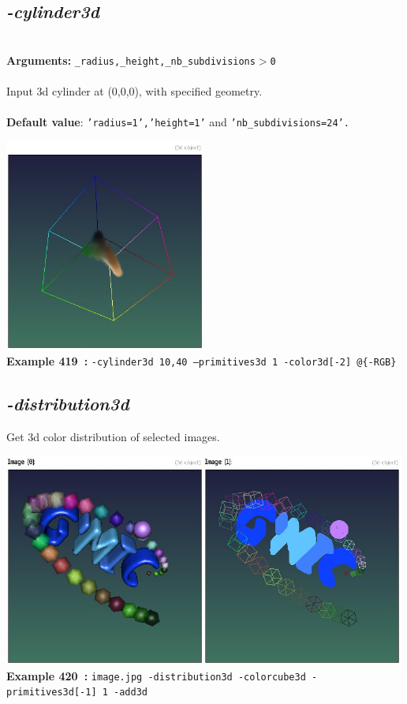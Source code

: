\documentclass[a4paper,11pt,twoside]{book}
\begin{document}
\subsection{\emph{-cylinder3d} }\vspace*{-0.5em}
~\\\textbf{Arguments: } 
{\small \texttt{\_radius,\_height,\_nb\_subdivisions$>$0}}\\~\\
Input 3d cylinder at (0,0,0), with specified geometry.
~\\~\\\textbf{Default value}: {\small \texttt{'radius=1','height=1'} and \texttt{'nb\_subdivisions=24'.}}
\begin{center}\includegraphics[keepaspectratio=true,height=7cm,width=\textwidth]{img/gmic_def419.jpg}\\
{\footnotesize \textbf{Example 419~:} \texttt{-cylinder3d 10,40 --primitives3d 1 -color3d[-2] @\{-RGB\}}}
\end{center}

\subsection{\emph{-distribution3d} }\vspace*{-0.5em}
Get 3d color distribution of selected images.
\begin{center}\includegraphics[keepaspectratio=true,height=7cm,width=\textwidth]{img/gmic_def420.jpg}\\
{\footnotesize \textbf{Example 420~:} \texttt{image.jpg -distribution3d -colorcube3d -primitives3d[-1] 1 -add3d}}
\end{center}
\end{document}
